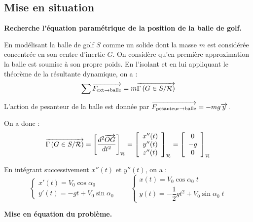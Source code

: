 \documentclass[10pt]{article}
\begin{document}
\subsection{Mise en situation}

\textbf{Recherche l'équation paramétrique de la position de la balle de golf.}


En modélisant la balle de golf \textbf{$S$} comme un solide dont la masse $m$ est considérée concentrée en son centre d'inertie $G$. On considère qu'en première approximation la balle est soumise à son propre poids.%
En l'isolant et en lui appliquant le théorème de la résultante dynamique, on a :
$$
\sum \overrightarrow{F_{\text{ext}\rightarrow \text{balle}}} = m\overrightarrow{\Gamma \left( {G} \in {S}/{\mathcal{R}}\right)}
$$

L'action de pesanteur de la balle est donnée par $\overrightarrow{F_{\text{pesanteur}\rightarrow \text{balle}}} = -mg\overrightarrow{y}$.


On a donc :
$$\overrightarrow{\Gamma \left( {G} \in {S}/{\mathcal{R}}\right)} = \left[ \dfrac{d^2 \overrightarrow{OG}}{dt^2}\right]_{\mathcal{R}}
=\left[ \begin{array}{c}
x''(t) \\ y''(t) \\ z''(t)
\end{array}\right]_{\mathcal{R}}
=\left[ \begin{array}{c}
0 \\ -g \\ 0
\end{array}\right]_{\mathcal{R}}
$$

En intégrant successivement $x''(t)$ et $y''(t)$, on a : 
$$
\left\{ 
\begin{array}{l}
x'(t) =  V_0 \cos\alpha_0\\ 
y'(t) =  -gt +V_0 \sin\alpha_0
\end{array}
\right.
\quad
\quad
\left\{ 
\begin{array}{l}
x(t) = V_0 \cos\alpha_0 \; t \\ 
y(t) = -\dfrac{1}{2}gt^2 +  V_0 \sin\alpha_0 \; t
\end{array}
\right.
$$

\textbf{Mise en équation du problème.}
\end{document}
